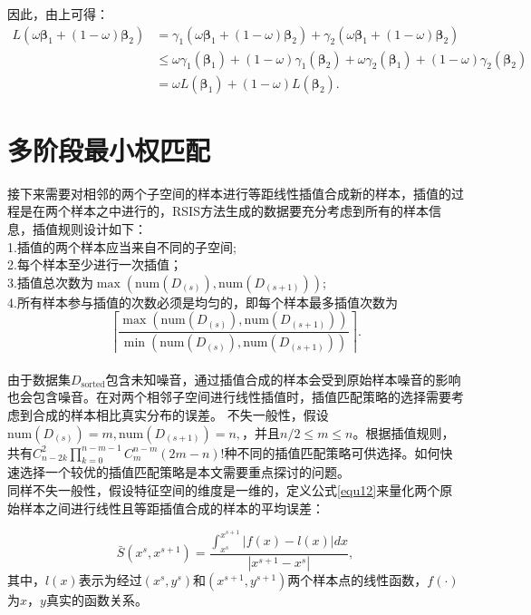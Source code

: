 \documentclass{NauThesis}
\begin{document}
因此，由上可得：
$$\begin{aligned} L(\omega\boldsymbol{\beta}_1+(1-\omega)\boldsymbol{\beta}_2)
    &=\gamma_1(\omega\boldsymbol{\beta}_1+(1-\omega)\boldsymbol{\beta}_2)+\gamma_2(\omega\boldsymbol{\beta}_1+(1-\omega)\boldsymbol{\beta}_2) \\
    &\le \omega\gamma_1(\boldsymbol{\beta}_1)+(1-\omega)\gamma_1(\boldsymbol{\beta}_2)+\omega\gamma_2(\boldsymbol{\beta}_1)+(1-\omega)\gamma_2(\boldsymbol{\beta}_2) \\
    &=\omega L(\boldsymbol{\beta}_1)+(1-\omega)L(\boldsymbol {\beta}_2)
    . \end{aligned}$$

\section{多阶段最小权匹配}
接下来需要对相邻的两个子空间的样本进行等距线性插值合成新的样本，插值的过程是在两个样本之中进行的，RSIS方法生成的数据要充分考虑到所有的样本信息，插值规则设计如下：
\\\hspace*{2em}1.插值的两个样本应当来自不同的子空间;
\\\hspace*{2em}2.每个样本至少进行一次插值；
\\\hspace*{2em}3.插值总次数为$\max(\text{num}{(D_{(s)}),\text{num}(D_{(s+1)})})$;
\\\hspace*{2em}4.所有样本参与插值的次数必须是均匀的，即每个样本最多插值次数为$$\left\lceil \frac{\max(\text{num}{(D_{(s)}),\text{num}(D_{(s+1)})})}{\min(\text{num}{(D_{(s)}),\text{num}(D_{(s+1)})})}\right\rceil.$$
\\\hspace*{2em}由于数据集$D_{\text{sorted}}$包含未知噪音，通过插值合成的样本会受到原始样本噪音的影响也会包含噪音。在对两个相邻子空间进行线性插值时，插值匹配策略的选择需要考虑到合成的样本相比真实分布的误差。
不失一般性，假设$\text{num}(D_{(s)})=m,\text{num}(D_{(s+1)})=n,$，并且$n/2\le{m}\le{n}$。根据插值规则，共有$
C_{n-2k}^{2}\prod_{k=0}^{n-m-1} C_{m}^{n-m}(2m-n)!$种不同的插值匹配策略可供选择。如何快速选择一个较优的插值匹配策略是本文需要重点探讨的问题。
\\\hspace*{2em}同样不失一般性，假设特征空间的维度是一维的，定义公式\eqref{equ12}来量化两个原始样本之间进行线性且等距插值合成的样本的平均误差：

\begin{equation}\label{equ12}
\bar{S}(x^s,x^{s+1})=\frac{\int_{x^s}^{x^{s+1}}|f(x)-l(x)| dx}{|x^{s+1}-x^s|}, 
\end{equation}
其中，$l(x)$表示为经过$(x^s,y^s)$和$(x^{s+1},y^{s+1})$两个样本点的线性函数，$f(\cdot)$为$x$，$y$真实的函数关系。
\end{document}
